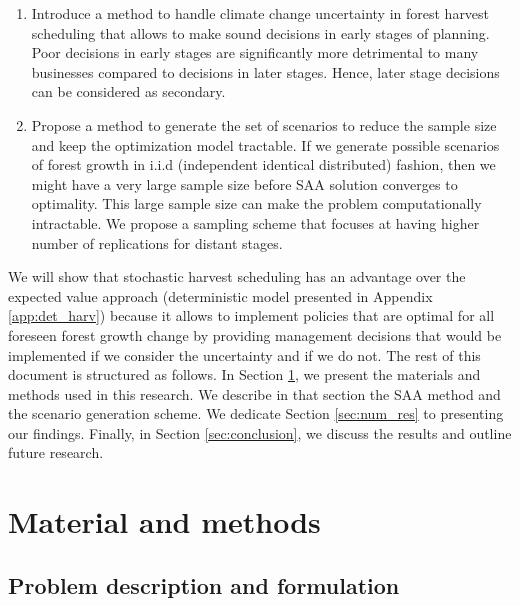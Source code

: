 \documentclass[forests,article,submit,moreauthors,pdftex]{Definitions/mdpi}
\begin{document}
\begin{enumerate}
    \item Introduce a method to handle climate change uncertainty in forest harvest scheduling that allows to make sound decisions in early stages of  planning. Poor decisions in early stages are significantly more detrimental to many businesses compared to decisions in later stages. Hence,  later stage decisions can be considered as secondary. 
    \item Propose a method to generate the set of scenarios to reduce the sample size and keep the optimization model tractable. If we generate possible scenarios of forest growth in i.i.d (independent identical distributed) fashion, then we might have a very large sample size before SAA solution converges to optimality. This large sample size can make the problem computationally intractable. 
    We propose a sampling scheme that focuses at having higher number of replications for distant stages.
\end{enumerate}  
We will show that  stochastic harvest scheduling has an advantage over the expected value approach (deterministic model presented in Appendix \ref{app:det_harv}) because it allows to implement policies that are optimal for all foreseen forest growth change by providing management decisions that would be implemented if we consider the uncertainty and if we do not. The rest of this document is structured as follows. In Section \ref{sec:material_methods}, we present the materials and methods used in this research. We describe in that section the SAA method and the scenario generation scheme. We dedicate Section \ref{sec:num_res} to presenting our findings. Finally, in Section \ref{sec:conclusion}, we discuss the results and outline future research.

\section{Material and methods} \label{sec:material_methods}

\subsection{Problem description and formulation} \label{sec:prob_descr}
\end{document}
